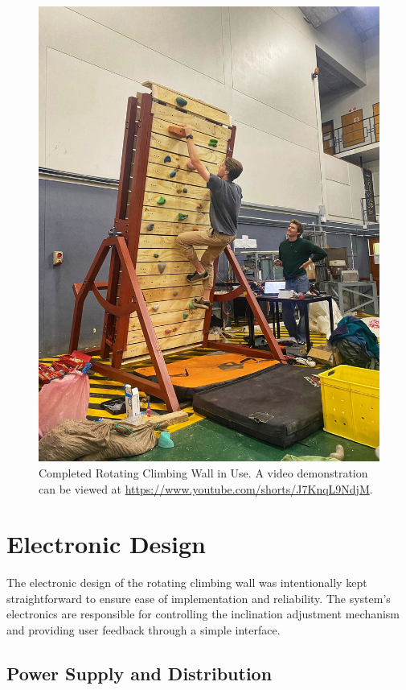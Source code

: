 \begin{figure}[ht]
    \centering
    \includegraphics[width=0.9\linewidth]{figs/final_design/zazuwall.jpeg}
    \caption{Completed Rotating Climbing Wall in Use. A video demonstration can be viewed at \url{https://www.youtube.com/shorts/J7KnqL9NdjM}.}
    \label{fig:final-image}
\end{figure}


\section{Electronic Design}

The electronic design of the rotating climbing wall was intentionally kept straightforward to ensure ease of implementation and reliability. The system's electronics are responsible for controlling the inclination adjustment mechanism and providing user feedback through a simple interface.

\subsection{Power Supply and Distribution}


